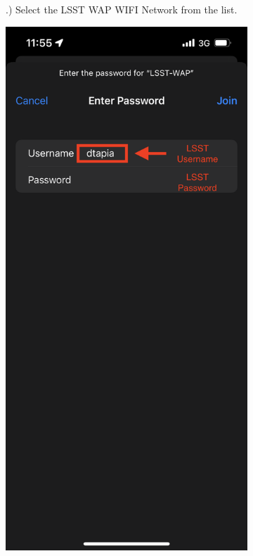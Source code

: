 \begin{figure}
\begin{subfigure}{0.30\textwidth}
      .) Select the LSST WAP WIFI Network from the list.
    \end{subfigure}
      \hfill
    \begin{subfigure}{0.30\textwidth}
      \includegraphics[width=\textwidth]{Images/ios2.png}

\end{subfigure}
\end{figure}
